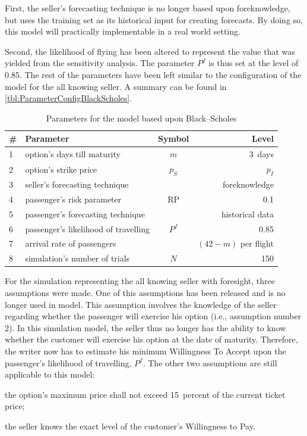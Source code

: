 First, the seller's forecasting technique is no longer based upon foreknowledge, but uses the training set as its historical input for creating forecasts. By doing so, this model will practically implementable in a real world setting.

Second, the likelihood of flying has been altered to represent the value that was yielded from the sensitivity analysis. The parameter $P^f$ is thus set at the level of 0.85. The rest of the parameters have been left similar to the configuration of the model for the all knowing seller. A summary can be found in \autoref{tbl:ParameterConfigBlackScholes}.


\begin{table}
\begin{center}
\begin{tabular}{l l c r}
    \toprule
    \#  & Parameter  &  Symbol  &  Level \\
    \midrule
    1  &  option's days till maturity  &  $m$  & 3~days \\
    2  &  option's strike price  &  $p_S$  &  $p_I$  \\
    3  &  seller's forecasting technique  &  ~  & foreknowledge \\
    4  &  passenger's risk parameter  &  $\mbox{RP}$  &  0.1 \\ 
    5  &  passenger's forecasting technique  &  ~  &  historical data \\
    6  &  passenger's likelihood of travelling  &  $P^f$  &  0.85 \\
    7  &  arrival rate of passengers  &  ~  &  $(42 - m)$ per flight \\
    8  &  simulation's number of trials  &  $N$  &  150 \\
    \bottomrule
\end{tabular}
\caption{Parameters for the model based upon Black--Scholes}
\label{tbl:ParameterConfigBlackScholes}
\end{center}
\end{table}


For the simulation representing the all knowing seller with foresight, three assumptions were made. One of this assumptions has been released and is no longer used in model. This assumption involves the knowledge of the seller regarding whether the passenger will exercise his option (i.e., assumption number 2). In this simulation model, the seller thus no longer has the ability to know whether the customer will exercise his option at the date of maturity. Therefore, the writer now has to estimate his minimum Willingness To Accept upon the passenger's likelihood of travelling, $P^f$. The other two assumptions are still applicable to this model:
\begin{compactenum}
\item the option's maximum price shall not exceed 15~percent of the current ticket price;
\item the seller knows the exact level of the customer's Willingness to Pay.
\end{compactenum}


